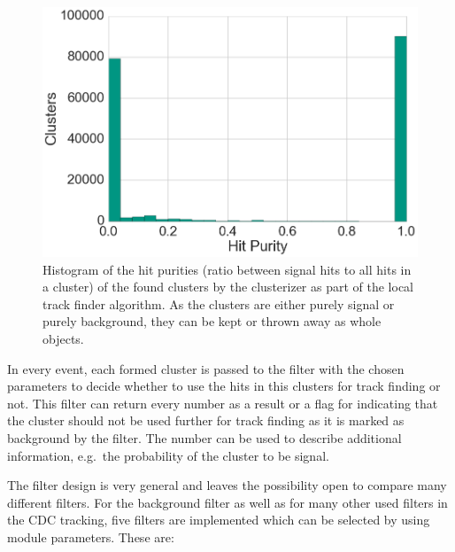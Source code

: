 \begin{figure}
  \centering
  \includegraphics[width=0.7\linewidth]{figures/workflow/cluster_purity.png}
  \caption{Histogram of the hit purities (ratio between signal hits to all hits in a cluster) of the found clusters by the clusterizer as part of the local track finder algorithm. As the clusters are either purely signal or purely background, they can be kept or thrown away as whole objects.}
  \label{fig-cluster-hit-purity}
\end{figure}

In every event, each formed cluster is passed to the filter with the chosen parameters to decide whether to use the hits in this clusters for track finding or not. This filter can return every number as a result or a flag for indicating that the cluster should not be used further for track finding as it is marked as background by the filter. The number can be used to describe additional information, e.g.\ the probability of the cluster to be signal.

The filter design is very general and leaves the possibility open to compare many different filters. For the background filter as well as for many other used filters in the CDC tracking, five filters are implemented which can be selected by using module parameters. These are:

